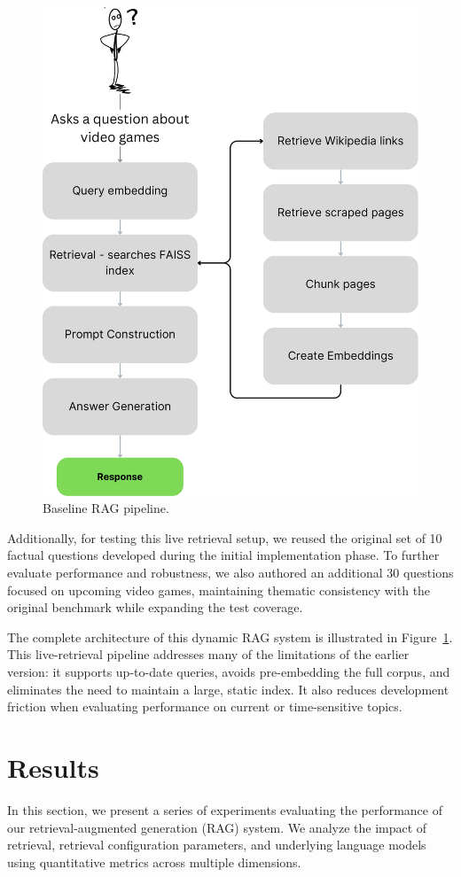 \documentclass[fleqn,moreauthors,10pt]{ds_report}
\begin{document}
\begin{figure}[h]
    \centering
    \includegraphics[width=0.7\linewidth]{rag-pipeline.pdf}
    \caption{Baseline RAG pipeline.}
    \label{fig:rag-pipeline}
\end{figure}

Additionally, for testing this live retrieval setup, we reused the original set of 10 factual questions developed during the initial implementation phase. To further evaluate performance and robustness, we also authored an additional 30 questions focused on upcoming video games, maintaining thematic consistency with the original benchmark while expanding the test coverage.

The complete architecture of this dynamic RAG system is illustrated in Figure~\ref{fig:rag-pipeline}. This live-retrieval pipeline addresses many of the limitations of the earlier version: it supports up-to-date queries, avoids pre-embedding the full corpus, and eliminates the need to maintain a large, static index. It also reduces development friction when evaluating performance on current or time-sensitive topics.

\section*{Results}

In this section, we present a series of experiments evaluating the performance of our retrieval-augmented generation (RAG) system. We analyze the impact of retrieval, retrieval configuration parameters, and underlying language models using quantitative metrics across multiple dimensions.
\end{document}
